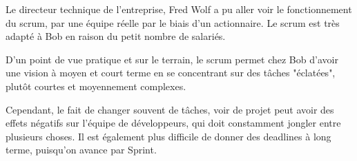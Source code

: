 Le directeur technique de l'entreprise, Fred Wolf a pu aller voir le fonctionnement du scrum, par une équipe réelle par le biais d'un actionnaire. 
Le scrum est très adapté à Bob en raison du petit nombre de salariés.


D'un point de vue pratique et sur le terrain, le scrum permet chez Bob d'avoir une vision à moyen et court terme en se concentrant sur des tâches "éclatées", plutôt courtes et moyennement complexes. 

Cependant, le fait de changer souvent de tâches, voir de projet peut avoir des effets négatifs sur l'équipe de développeurs, qui doit constamment jongler entre plusieurs choses. 
Il est également plus difficile de donner des deadlines à long terme, puisqu'on avance par Sprint. 




